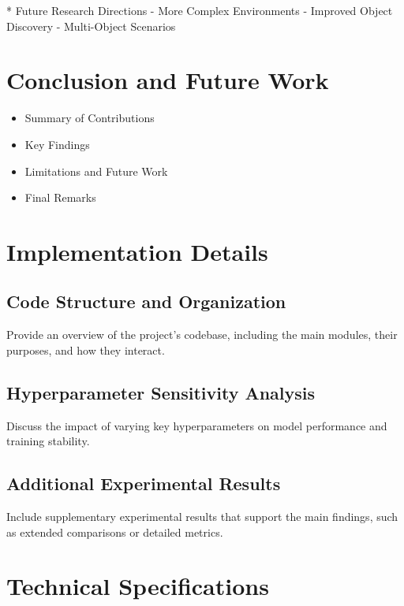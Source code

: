 \documentclass[
	english,
	ruledheaders=section,
	class=report,
	thesis={type=master},
	accentcolor=9c,
	custommargins=true,
	marginpar=false,
	parskip=half-,
	fontsize=11pt,
]{tudapub}
\begin{document}
* Future Research Directions
	- More Complex Environments
	- Improved Object Discovery
	- Multi-Object Scenarios

\chapter{Conclusion and Future Work}
\label{chap:conclusion}

\begin{itemize}
	\item Summary of Contributions
	\item Key Findings
	\item Limitations and Future Work
	\item Final Remarks
\end{itemize}

\printbibliography[title={References}]

\appendix

\chapter{Implementation Details}
\label{app:implementation}

\section{Code Structure and Organization}
\label{app:code_structure}
Provide an overview of the project's codebase, including the main modules, their purposes, and how they interact.

\section{Hyperparameter Sensitivity Analysis}
\label{app:hyperparameter_analysis}
Discuss the impact of varying key hyperparameters on model performance and training stability.

\section{Additional Experimental Results}
\label{app:additional_results}
Include supplementary experimental results that support the main findings, such as extended comparisons or detailed metrics.

\chapter{Technical Specifications}
\label{app:technical_specs}
\end{document}
